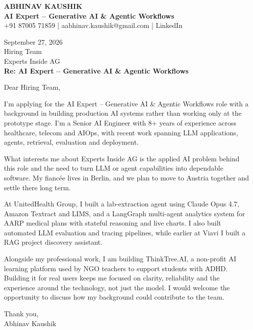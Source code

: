 \documentclass[10pt,a4paper]{article}
\begin{document}
\begin{center}
{\Large\bfseries ABHINAV KAUSHIK}\\[2pt]
{\bfseries AI Expert – Generative AI \& Agentic Workflows}\\[2pt]
+91 87005 71859 \quad | \quad aabhinav.kaushik@gmail.com \quad | \quad LinkedIn
\end{center}
\vspace{8pt}
September 27, 2026\\[6pt]
Hiring Team\\
Experts Inside AG\\[4pt]
\textbf{Re: AI Expert – Generative AI \& Agentic Workflows}

Dear Hiring Team,

I’m applying for the AI Expert – Generative AI \& Agentic Workflows role with a background in building production AI systems rather than working only at the prototype stage. I’m a Senior AI Engineer with 8+ years of experience across healthcare, telecom and AIOps, with recent work spanning LLM applications, agents, retrieval, evaluation and deployment.

What interests me about Experts Inside AG is the applied AI problem behind this role and the need to turn LLM or agent capabilities into dependable software. My fiancée lives in Berlin, and we plan to move to Austria together and settle there long term.

At UnitedHealth Group, I built a lab-extraction agent using Claude Opus 4.7, Amazon Textract and LIMS, and a LangGraph multi-agent analytics system for AARP medical plans with stateful reasoning and live charts. I also built automated LLM evaluation and tracing pipelines, while earlier at Viavi I built a RAG project discovery assistant.

Alongside my professional work, I am building ThinkTree.AI, a non-profit AI learning platform used by NGO teachers to support students with ADHD. Building it for real users keeps me focused on clarity, reliability and the experience around the technology, not just the model. I would welcome the opportunity to discuss how my background could contribute to the team.

Thank you,\\
Abhinav Kaushik
\end{document}
